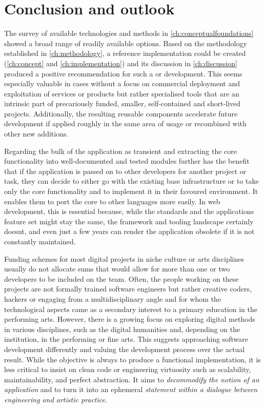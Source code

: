\chapter{Conclusion and outlook}
\label{ch:conclusion-and-outlook}

The survey of available technologies and methods in \autoref{ch:conceptualfoundations} showed a broad range of readily available options.
Based on the methodology established in \autoref{ch:methodology}, a reference implementation could be created (\autoref{ch:concept} and \autoref{ch:implementation}) and its discussion in \autoref{ch:discussion} produced a positive recommendation for such a  or  development.
This seems especially valuable in cases without a focus on commercial deployment and exploitation of services or products but rather specialised tools that are an intrinsic part of precariously funded, smaller, self-contained and short-lived projects.
Additionally, the resulting reusable components accelerate future development if applied roughly in the same area of usage or recombined with other new additions.

Regarding the bulk of the application as transient and extracting the core functionality into well-documented and tested modules further has the benefit that if the application is passed on to other developers for another project or task, they can decide to either go with the existing base infrastructure or to take only the core functionality and to implement it in their favoured environment.
It enables them to port the core to other languages more easily.
In web development, this is essential because, while the standards and the application\textquotesingle s feature set might stay the same, the framework and tooling landscape certainly doesn\textquotesingle t, and even just a few years can render the application obsolete if it is not constantly maintained.

Funding schemes for most digital projects in niche culture or arts disciplines usually do not allocate sums that would allow for more than one or two developers to be included on the team.
Often, the people working on these projects are not formally trained software engineers but rather creative coders, hackers or engaging from a multidisciplinary angle and for whom the technological aspects came as a secondary interest to a primary education in the performing arts.
However, there is a growing focus on exploring digital methods in various disciplines, such as the digital humanities and, depending on the institution, in the performing or fine arts.
This suggests approaching software development differently and valuing the development process over the actual result.
While the objective is always to produce a functional implementation, it is less critical to insist on clean code or engineering virtuosity such as scalability, maintainability, and perfect abstraction.
It aims to \emph{decommodify the notion of an application} and to turn it into an ephemeral \emph{statement within a dialogue between engineering and artistic practice}.

